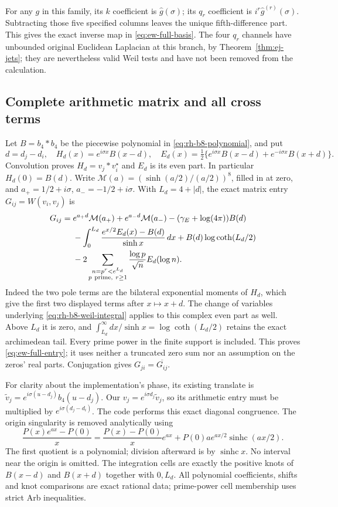 For any $g$ in this family, its $k$ coefficient is $\widehat g(\sigma)$;
its $q_r$ coefficient is $i^r\widehat g^{(r)}(\sigma)$. Subtracting
those five specified columns leaves the unique fifth-difference part.
This gives the exact inverse map in \eqref{eq:ew-full-basis}. The
four $q_r$ channels have unbounded original Euclidean Laplacian at
this branch, by Theorem~\ref{thm:ej-jets}; they are nevertheless valid
Weil tests and have not been removed from the calculation.

\subsection{Complete arithmetic matrix and all cross terms}

Let $B=b_4*b_4$ be the piecewise polynomial in
\eqref{eq:rh-b8-polynomial}, and put
\[
 d=d_j-d_i,\quad H_d(x)=e^{i\sigma x}B(x-d),\quad
 E_d(x)=\tfrac12\{e^{i\sigma x}B(x-d)+e^{-i\sigma x}B(x+d)\}.
\]
Convolution proves $H_d=v_j*v_i^\star$ and $E_d$ is its even part.
In particular $H_d(0)=B(d)$. Write
$\mathcal M(a)=(\sinh(a/2)/(a/2))^8$, filled in at zero, and
$a_+=1/2+i\sigma$, $a_-=-1/2+i\sigma$. With $L_d=4+|d|$,
the exact matrix entry $G_{ij}=W(v_i,v_j)$ is
\begin{align}
 G_{ij}={}&e^{a_+d}\mathcal M(a_+)+e^{a_-d}\mathcal M(a_-)
              -(\gamma_E+\log(4\pi))B(d)\notag\\
 &-\int_0^{L_d}\frac{e^{x/2}E_d(x)-B(d)}{\sinh x}\,dx
                  +B(d)\log\coth(L_d/2)\notag\\
 &-2\sum_{\substack{n=p^r<e^{L_d}\\p\ \mathrm{prime},\ r\ge1}}
                  \frac{\log p}{\sqrt n}E_d(\log n).
 \label{eq:ew-full-entry}
\end{align}
Indeed the two pole terms are the bilateral exponential moments of
$H_d$, which give the first two displayed terms after $x\mapsto x+d$.
The change of variables underlying \eqref{eq:rh-b8-weil-integral}
applies to this complex even part as well. Above $L_d$ it is zero,
and $\int_{L_d}^\infty dx/\sinh x=\log\coth(L_d/2)$ retains the
exact archimedean tail. Every prime power in the finite support is
included. This proves \eqref{eq:ew-full-entry}; it uses neither a
truncated zero sum nor an assumption on the zeros' real parts.
Conjugation gives $G_{ji}=\overline{G_{ij}}$.

For clarity about the implementation's phase, its existing translate
is $\widetilde v_j=e^{i\sigma(u-d_j)}b_4(u-d_j)$.
Our $v_j=e^{i\sigma d_j}\widetilde v_j$, so its arithmetic entry
must be multiplied by $e^{i\sigma(d_j-d_i)}$. The code performs
this exact diagonal congruence. The origin singularity is removed
analytically using
\[
 \frac{P(x)e^{ax}-P(0)}x
   =\frac{P(x)-P(0)}x e^{ax}
            +P(0)a e^{ax/2}\operatorname{sinhc}(ax/2).
\]
The first quotient is a polynomial; division afterward is by
$\operatorname{sinhc}x$. No interval near the origin is omitted.
The integration cells are exactly the positive knots of $B(x-d)$
and $B(x+d)$ together with $0,L_d$. All polynomial coefficients,
shifts and knot comparisons are exact rational data; prime-power
cell membership uses strict Arb inequalities.

